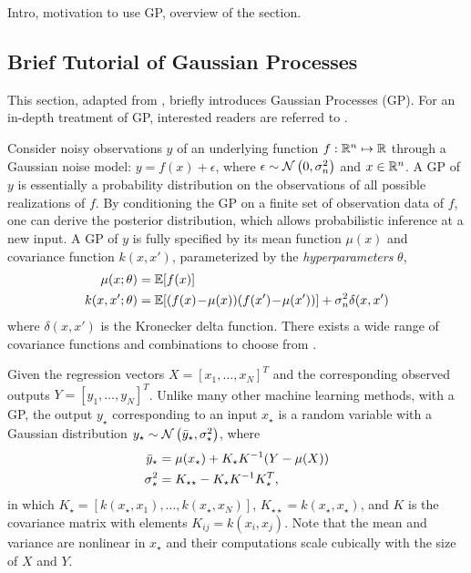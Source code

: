 \begin{todo}
  Intro, motivation to use GP, overview of the section.
\end{todo}

\subsection{Brief Tutorial of Gaussian Processes}
\label{sec:modeling:gp}

\iffalse
This section, adapted from , briefly introduces Gaussian Processes (GP).
For an in-depth treatment of GP, interested readers are referred to \cite{Rasmussen2006}.

Consider noisy observations \(y\) of an underlying function \(f: \mathbb{R}^n \mapsto \mathbb{R}\) through a Gaussian noise model: \(y = f(x) + \epsilon\), where \(\epsilon \sim \operatorname*{\mathcal{N}}\left(0, \sigma_n^2\right)\) and  \(x \in \mathbb{R}^n\).
A GP of $y$ is essentially a probability distribution on the observations of all possible realizations of $f$.
By conditioning the GP on a finite set of observation data of $f$, one can derive the posterior distribution, which allows probabilistic inference at a new input.
%
A GP of \(y\) is fully specified by its mean function \(\mu(x)\) and covariance function \(k(x,x')\), parameterized by the \emph{hyperparameters} \(\theta\),
\begin{align*}
\label{E:gp:prior}
\mu(x; \theta) &= \mathbb{E} [f(x)] \\
k(x,x'; \theta) &= \mathbb{E} [(f(x)\!-\!\mu(x)) (f(x') \!-\! \mu(x'))] + \sigma_n^2 \delta(x,x') \nonumber
\end{align*}
where \(\delta(x,x')\) is the Kronecker delta function.
There exists a wide range of covariance functions and combinations to choose from \cite{Rasmussen2006}.

Given the regression vectors \(X = [x_1, \dots, x_N]^T\) and the corresponding observed outputs \(Y = [y_1, \dots, y_N]^T\).
Unlike many other machine learning methods, with a GP, the output \(y_\star\) corresponding to an input \(x_\star\) is a random variable with a Gaussian distribution \(y_{\star} \sim \operatorname*{\mathcal{N}}\left(\bar{y}_\star, \sigma_\star^2\right)\), where
\begin{subequations}
\label{E:gp-regression}
\begin{align*}
\bar{y}_\star &= \mu(x_\star) + K_\star K^{-1} (Y - \mu(X))\\
\sigma_\star^2 &= K_{\star \star} - K_\star K^{-1} K_\star^T \text,
\end{align*}
\end{subequations}
in which \(K_\star = [k(x_\star, x_1), \dots, k(x_\star, x_N)]\), \(K_{\star \star} = k(x_\star, x_\star)\), and $K$ is the covariance matrix with elements \(K_{ij} = k(x_i, x_j)\).
Note that the mean and variance are nonlinear in $x_{\star}$ and their computations scale cubically with the size of $X$ and $Y$.

